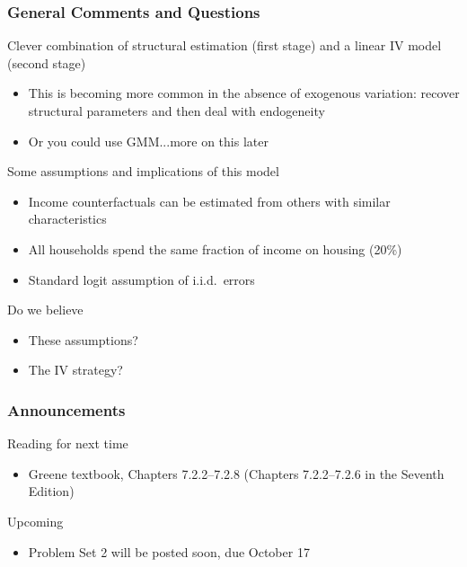 \documentclass{beamer}\usepackage[]{graphicx}\usepackage[]{color}
\begin{document}
\begin{frame}\frametitle{General Comments and Questions}
    Clever combination of structural estimation (first stage) and a linear IV model (second stage)
    \begin{itemize}
      \item This is becoming more common in the absence of exogenous variation: recover structural parameters and then deal with endogeneity
      \item Or you could use GMM...more on this later
    \end{itemize}
    \vspace{2ex}
    Some assumptions and implications of this model
    \begin{itemize}
      \item Income counterfactuals can be estimated from others with similar characteristics
      \item All households spend the same fraction of income on housing (20\%)
      \item Standard logit assumption of i.i.d.\ errors
    \end{itemize}
    \vspace{2ex}
    Do we believe
    \begin{itemize}
      \item These assumptions?
      \item The IV strategy?
    \end{itemize}
\end{frame}

\begin{frame}\frametitle{Announcements}
    Reading for next time
    \begin{itemize}
        \item Greene textbook, Chapters 7.2.2--7.2.8 (Chapters 7.2.2--7.2.6 in the Seventh Edition)
    \end{itemize}
    \vspace{3ex}
    Upcoming
    \begin{itemize}
        \item Problem Set 2 will be posted soon, due October 17
    \end{itemize}
\end{frame}
\end{document}
